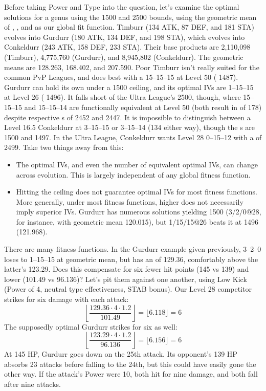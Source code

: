 Before taking Power and Type into the question, let's examine the optimal
 solutions for a genus using the 1500 and 2500 \CP{} bounds, using the
 geometric mean of , , and \MHP{} as our global fit function.
Timburr (134 ATK, 87 DEF, and 181 STA) evolves into
  Gurdurr (180 ATK, 134 DEF, and 198 STA), which evolves into
  Conkeldurr (243 ATK, 158 DEF, 233 STA).
Their base products are 2,110,098 (Timburr), 4,775,760 (Gurdurr),
  and 8,945,802 (Conkeldurr).
The geometric means are 128.263, 168.402, and 207.590.
Poor Timburr isn't really suited for the common PvP Leagues,
  and does best with a 15--15--15 at Level 50 (\CP{} 1487).
Gurdurr can hold its own under a 1500 \CP{} ceiling, and its
  optimal IVs are 1--15--15 at Level 26 (\CP{} 1496).
It falls short of the Ultra League's 2500, though, where
  15--15--15 and 15--15--14 are functionally equivalent
  at Level 50 (both result in \MHP{} of 178) despite
  respective \CP{}s of 2452 and 2447.
It is impossible to distinguish between a Level 16.5 Conkeldurr at
  3--15--15 or 3--15--14 (134 \MHP{} either way), though
  the \CP{}s are 1500 and 1497.
In the Ultra League, Conkeldurr wants Level 28 0--15--12 with
  a \CP{} of 2499.
Take two things away from this:
\begin{itemize}
\item The optimal IVs, and even the number of equivalent optimal IVs, can change across evolution.
  This is largely independent of any global fitness function.
\item Hitting the ceiling does not guarantee optimal IVs for most fitness functions.
  More generally, under most fitness functions, higher \CP{} does not necessarily imply superior IVs.
    Gurdurr has numerous solutions yielding 1500 \CP{} (3/2/0@28, for instance, with geometric
    mean 120.015), but 1/15/15@26 beats it at 1496 (121.968).
\end{itemize}
There are many fitness functions. In the Gurdurr example given previously, 3--2--0 loses
    to 1--15--15 at geometric mean, but has an  of 129.36, comfortably above the latter's 123.29.
 Does this compensate for six fewer hit points (145 vs 139) and lower  (101.49 vs 96.136)?
 Let's pit them against one another, using Low Kick (Power of 4, neutral type effectiveness, STAB bonus).
 Our Level 28 competitor strikes for six damage with each attack:
    \[ \left\lfloor \frac{129.36 \cdot 4 \cdot 1.2}{101.49} \right\rfloor = \lfloor 6.118 \rfloor = 6 \]
 The supposedly optimal Gurdurr strikes for six as well:
    \[ \left\lfloor \frac{123.29 \cdot 4 \cdot 1.2}{96.136} \right\rfloor = \lfloor 6.156 \rfloor = 6 \]
 At 145 HP, Gurdurr goes down on the 25th attack.
 Its opponent's 139 HP absorbs 23 attacks before falling to the 24th, but this could
    have easily gone the other way.
 If the attack's Power were 10, both hit for nine damage, and both fall after nine attacks.

